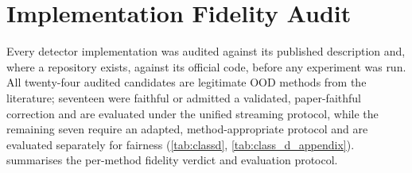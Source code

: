 
\section{Implementation Fidelity Audit}\label{app:fidelity}

Every detector implementation was audited against its published description and,
where a repository exists, against its official code, before any experiment was run.
All twenty-four audited candidates are legitimate OOD methods from the literature;
seventeen were faithful or admitted a validated, paper-faithful correction and are
evaluated under the unified streaming protocol, while the remaining seven require an
adapted, method-appropriate protocol and are evaluated separately for fairness
(\cref{tab:classd}, \cref{tab:class_d_appendix}).  summarises the
per-method fidelity verdict and evaluation protocol.

